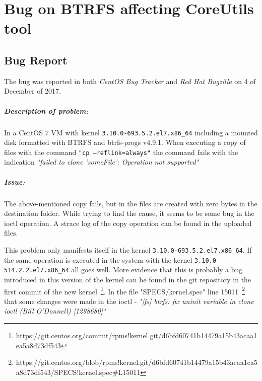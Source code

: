 \chapter{Bug on BTRFS affecting CoreUtils tool}
\label{ann:bug}

\section{Bug Report}
\label{sec:bug_report}

The bug was reported in both \textit{CentOS Bug Tracker} and \textit{Red Hat Bugzilla} on 4 of December of 2017.

\paragraph{Description of problem:}

In a CentOS 7 VM with kernel \texttt{3.10.0-693.5.2.el7.x86\_64} including a mounted disk formatted with BTRFS and btrfs-progs v4.9.1.
When executing a copy of files with the command \texttt{"cp --reflink=always"} the command fails with the indication \textit{"failed to clone 'someFile': Operation not supported"}

\paragraph{Issue:}

The above-mentioned copy fails, but in the files are created with zero bytes in the destination folder.
While trying to find the cause, it seems to be some bug in the ioctl operation. A strace log of the copy operation can be found in the uploaded files.

This problem only manifests itself in the kernel \texttt{3.10.0-693.5.2.el7.x86\_64}. If the same operation is executed in the system with the kernel \texttt{3.10.0-514.2.2.el7.x86\_64} all goes well.
More evidence that this is probably a bug introduced in this version of the kernel can be found in the git repository in the first commit of the new kernel~\footnote{https://git.centos.org/commit/rpms!kernel.git/d6bfd60741b14479a15b43acaa1ea5a8d73df543}.
In the file "SPECS/kernel.spec" line 15011~\footnote{https://git.centos.org/blob/rpms!kernel.git/d6bfd60741b14479a15b43acaa1ea5a8d73df543/SPECS!kernel.spec\#L15011} that some changes were made in the ioctl - \textit{"[fs] btrfs: fix uninit variable in clone ioctl (Bill O'Donnell) [1298680]"}

